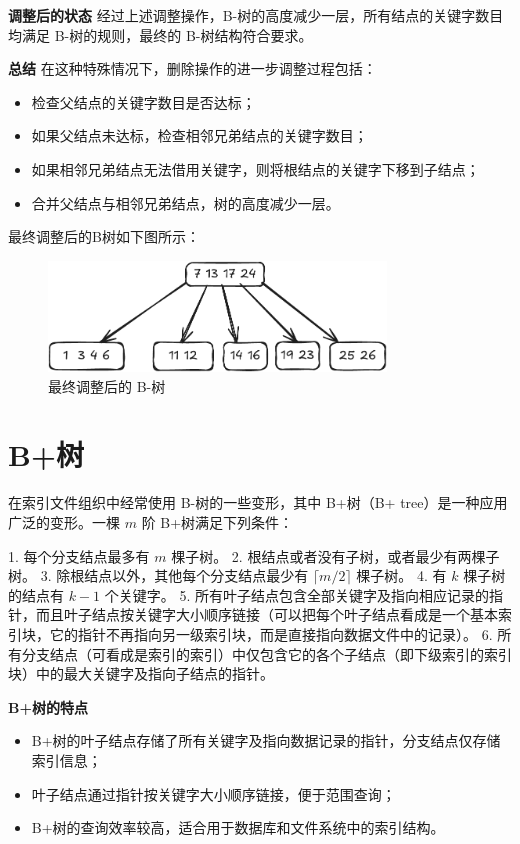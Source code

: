 \documentclass[lang=cn,newtx,10pt,scheme=chinese]{elegantbook}
\begin{document}
\textbf{调整后的状态}  
经过上述调整操作，B-树的高度减少一层，所有结点的关键字数目均满足 B-树的规则，最终的 B-树结构符合要求。


\textbf{总结}  
在这种特殊情况下，删除操作的进一步调整过程包括：
\begin{itemize}
  \item 检查父结点的关键字数目是否达标；
  \item 如果父结点未达标，检查相邻兄弟结点的关键字数目；
  \item 如果相邻兄弟结点无法借用关键字，则将根结点的关键字下移到子结点；
  \item 合并父结点与相邻兄弟结点，树的高度减少一层。
\end{itemize}

最终调整后的B树如下图所示：

\begin{figure}[h!]
    \centering
    \includegraphics[width=0.8\textwidth]{./figure/pdf/cropped/Btree_del6.pdf}
    \caption{最终调整后的 B-树}
    \label{fig:Btree_final}

\end{figure}
\section{B+树}
在索引文件组织中经常使用 B-树的一些变形，其中 B+树（B+ tree）是一种应用广泛的变形。一棵 $m$ 阶 B+树满足下列条件：

1. 每个分支结点最多有 $m$ 棵子树。
2. 根结点或者没有子树，或者最少有两棵子树。
3. 除根结点以外，其他每个分支结点最少有 $\lceil m/2 \rceil$ 棵子树。
4. 有 $k$ 棵子树的结点有 $k-1$ 个关键字。
5. 所有叶子结点包含全部关键字及指向相应记录的指针，而且叶子结点按关键字大小顺序链接（可以把每个叶子结点看成是一个基本索引块，它的指针不再指向另一级索引块，而是直接指向数据文件中的记录）。
6. 所有分支结点（可看成是索引的索引）中仅包含它的各个子结点（即下级索引的索引块）中的最大关键字及指向子结点的指针。


\textbf{B+树的特点}  
\begin{itemize}
  \item B+树的叶子结点存储了所有关键字及指向数据记录的指针，分支结点仅存储索引信息；
  \item 叶子结点通过指针按关键字大小顺序链接，便于范围查询；
  \item B+树的查询效率较高，适合用于数据库和文件系统中的索引结构。
\end{itemize}
\end{document}
